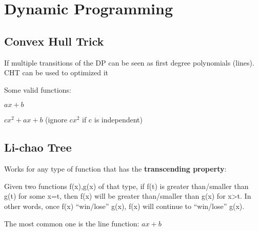 \chapter{Dynamic Programming}

\section{Convex Hull Trick}

    If multiple transitions of the DP can be seen as 
    first degree polynomials (lines). CHT can be used to optimized it

    Some valid functions:

    $ax + b$
    
    $cx^2 + ax + b$ 
    (ignore $cx^2$ if c is independent)


\section{Li-chao Tree}

    Works for any type of function that has the \textbf{transcending property}:

    Given two functions f(x),g(x) of that type, 
    if f(t) is greater than/smaller than g(t) for some x=t,
    then f(x) will be greater than/smaller than g(x) for x>t.
    In other words, once f(x) “win/lose” g(x), f(x) will continue to “win/lose” g(x).

    The most common one is the line function: $ ax + b $
    